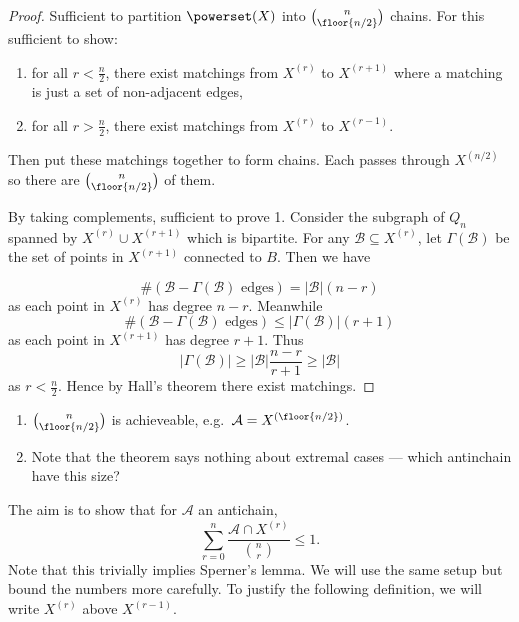 \documentclass[a4paper]{article}
\begin{document}
\begin{proof}
  Sufficient to partition \(\powerset(X)\) into \(\binom{n}{\floor{n/2}}\) chains. For this sufficient to show:
  \begin{enumerate}
  \item for all \(r < \frac{n}{2}\), there exist matchings from \(X^{(r)}\) to \(X^{(r + 1)}\) where a matching is just a set of non-adjacent edges,
  \item for all \(r > \frac{n}{2}\), there exist matchings from \(X^{(r)}\) to \(X^{(r - 1)}\).
  \end{enumerate}
  Then put these matchings together to form chains. Each passes through \(X^{(n/2)}\) so there are \(\binom{n}{\floor{n/2}}\) of them.

  By taking complements, sufficient to prove 1. Consider the subgraph of \(Q_n\) spanned by \(X^{(r)} \cup X^{(r + 1)}\) which is bipartite. For any \(\mathcal B \subseteq X^{(r)}\), let \(\Gamma(\mathcal B)\) be the set of points in \(X^{(r + 1)}\) connected to \(B\). Then we have

  \[
    \# (\mathcal B - \Gamma(\mathcal B) \text{ edges}) = |\mathcal B| (n - r)
  \]
  as each point in \(X^{(r)}\) has degree \(n - r\). Meanwhile
  \[
    \# (\mathcal B - \Gamma(\mathcal B) \text{ edges}) \leq |\Gamma(\mathcal B)| (r + 1)
  \]
  as each point in \(X^{(r + 1)}\) has degree \(r + 1\). Thus
  \[
    |\Gamma(\mathcal B)| \geq |\mathcal B| \frac{n - r}{r + 1} \geq |\mathcal B|
  \]
  as \(r < \frac{n}{2}\). Hence by Hall's theorem there exist matchings.
\end{proof}

\begin{remark}\leavevmode
  \begin{enumerate}
  \item \(\binom{n}{\floor{n/2}}\) is achieveable, e.g.\ \(\mathcal A = X^{(\floor{n/2})}\).
  \item Note that the theorem says nothing about extremal cases --- which antinchain have this size?
  \end{enumerate}
\end{remark}

The aim is to show that for \(\mathcal A\) an antichain,
\[
  \sum_{r = 0}^n \frac{\mathcal A \cap X^{(r)}}{\binom{n}{r}} \leq 1.
\]
Note that this trivially implies Sperner's lemma. We will use the same setup but bound the numbers more carefully. To justify the following definition, we will write \(X^{(r)}\) above \(X^{(r - 1)}\).
\end{document}
